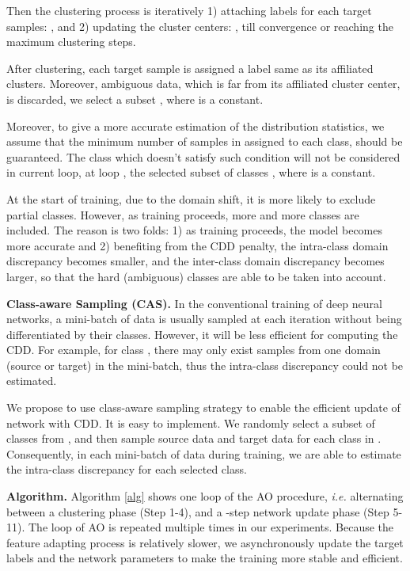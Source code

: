 \documentclass[10pt,twocolumn,letterpaper]{article}
\begin{document}
Then the clustering process is iteratively 
1) attaching labels for each target samples:
,
and
2) updating the cluster centers: 
,
till convergence or reaching the maximum clustering steps.

After clustering, each target sample  is assigned a label  same as its affiliated clusters.
Moreover, ambiguous data, which is far from its affiliated cluster center, is discarded,
\ie we select a subset
,
where  is a constant.



Moreover, to give a more accurate estimation of the distribution statistics, we assume that the minimum number of samples in  assigned to each class, should be guaranteed.
The class which doesn't satisfy such condition will not be considered in current loop, \ie
at loop , the selected subset of classes 
,
where  is a constant.


At the start of training, due to the domain shift, 
it is more likely to exclude partial classes.
However, as training proceeds,   
more and more classes are included.
The reason is two folds: 
1) as training proceeds, the model becomes more accurate 
and 
2) benefiting from the CDD penalty, 
the intra-class domain discrepancy becomes smaller, 
and the inter-class domain discrepancy becomes larger, 
so that the hard (\ie ambiguous) classes are able to be taken into account.







\textbf{Class-aware Sampling (CAS).}
In the conventional training of deep neural networks, 
a mini-batch of data is usually sampled at each iteration 
without being differentiated by their classes.
However, it will be less efficient for computing the CDD.
For example, for class , 
there may only exist samples from one domain (source or target) in the mini-batch, 
thus the intra-class discrepancy could not be estimated.

We propose to use class-aware sampling strategy to 
enable the efficient update of network with CDD.
It is easy to implement. 
We randomly select a subset of classes  from ,
and then sample source data and target data for each class in .
Consequently, in each mini-batch of data during training, 
we are able to estimate the intra-class discrepancy for each selected class. 



\textbf{Algorithm.}
Algorithm \ref{alg} shows one loop of the AO procedure, 
\emph{i.e.} alternating between a clustering phase (Step 1-4), and a -step network update phase (Step 5-11).  
The loop of AO is repeated multiple times in our experiments. 
Because the feature adapting process is relatively slower,
we asynchronously update the target labels and the network parameters
to make the training more stable and efficient.
\end{document}
